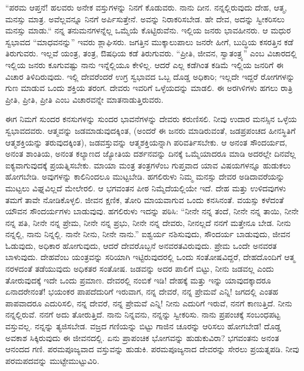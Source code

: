 “ಪರಮ ಆಪ್ತನೆ! ಹಲವರು ಅನೇಕ ವಸ್ತುಗಳನ್ನು ನಿನಗೆ ಕೊಡುವರು. ನಾನು ದೀನ. ನನ್ನಲ್ಲಿರುವುದು ದೇಹ, ಆತ್ಮ, ಮನಸ್ಸು ಮಾತ್ರ. ಅವೆಲ್ಲವನ್ನೂ ನಿನಗೆ ಅರ್ಪಿಸುತ್ತೇನೆ. ಅವನ್ನು ನಿರಾಕರಿಸಬೇಡ. ಹೇ ದೇವ, ಅದನ್ನು ಸ್ವೀಕರಿಸಲು ಮನಸ್ಸು ಮಾಡು.“ ನನ್ನ ತನುಮನಗಳನ್ನೆಲ್ಲ ಒಮ್ಮೆಯೆ ಕೊಟ್ಟಿರುವೆನು. ಇಲ್ಲಿಯ ಜನರು ಭಾವಹೀನರು. ಆ ಮಧುರ ಸ್ವಭಾವದ “ಮಾಧವನನ್ನು” ಇವರು ಶ್ಲಾಘಿಸರು. ಜಗತ್ತಿನ ಮುಕ್ಕಾಲುಪಾಲು ಜನರೇ ಹೀಗೆ, ಬುದ್ಧಿಯ ಕಸರತ್ತಿನ ಕಡೆ ತಿರುಗುವರು. ಇಲ್ಲವೆ ಯಂತ್ರ, ತಂತ್ರ, ಔಷಧಿಯ ಕಡೆ ತಿರುಗುವರು. “ಪ್ರೀತಿ, ಜೀವನ, ಸ್ವಾತಂತ್ರ್ಯ” ಎಂಬ ವಿಚಾರದಲ್ಲಿ ಇಲ್ಲಿಯ ಜನರು ಕೂಗುವಷ್ಟು ನಾನು ಇನ್ನೆಲ್ಲಿಯೂ ಕೇಳಿಲ್ಲ. ಆದರೆ ಎಲ್ಲ ಕಡೆಗಿಂತ ಕಡಿಮೆ ಇಲ್ಲಿಯ ಜನರಿಗೆ ಈ ವಿಚಾರ ತಿಳಿದಿರುವುದು. ಇಲ್ಲಿ ದೇವರೆಂದರೆ ಉಗ್ರ ಸ್ವಭಾವದ ಒಬ್ಬ ದೊಡ್ಡ ಅಧಿಕಾರಿ; ಇಲ್ಲದೇ ಇದ್ದರೆ ರೋಗಗಳನ್ನು ಗುಣ ಮಾಡುವ ಒಂದು ಶಕ್ತಿಯ ತರಂಗ. ದೇವರು ಇವರಿಗೆ ಒಳ್ಳೆಯದನ್ನು ಮಾಡಲಿ. ಈ ಅರಗಿಳಿಗಳು ಹಗಲು ರಾತ್ರಿ ಪ್ರೀತಿ, ಪ್ರೀತಿ, ಪ್ರೀತಿ ಎಂಬ ವಿಚಾರವನ್ನೇ ಮಾತನಾಡುತ್ತಿರುವರು.

ಈಗ ನಿಮಗೆ ಸುಂದರ ಕನಸುಗಳನ್ನು ಸುಂದರ ಭಾವನೆಗಳನ್ನು ದೇವರು ಕರುಣಿಸಲಿ. ನೀವು ಉದಾರ ಮನಸ್ಸಿನ ಒಳ್ಳೆಯ ಸ್ವಭಾವದವರು. ಆತ್ಮವನ್ನು ಜಡಮಾಡುವುದಕ್ಕಿಂತ, (ಅಂದರೆ ಈ ಜನರು ಮಾಡಿರುವಂತೆ, ಜಡಪ್ರಪಂಚದ ಹೀನಸ್ಥಿತಿಗೆ ಆತ್ಮಶಕ್ತಿಯನ್ನು ತರುವುದಕ್ಕಿಂತ), ಜಡವಸ್ತುವನ್ನು ಆತ್ಮಶಕ್ತಿಯನ್ನಾಗಿ ಪರಿವರ್ತಿಸಬೇಕು. ಆ ಅನಂತ ಸೌಂದರ್ಯದ, ಅನಂತ ಶಾಂತಿಯ, ಅನಂತ ಕಲ್ಯಾಣದ ಜ್ಯೋತಿಯ ದರ್ಶನವನ್ನು ದಿನಕ್ಕೆ ಒಮ್ಮೆಯಾದರೂ ಮಾಡಿ ಅದರಲ್ಲೇ ದಿನವೆಲ್ಲ ಐಕ್ಯವಾಗುವುದಕ್ಕೆ ಪ್ರಯತ್ನಿಸಬೇಕು. ಮಾಯಾ ಮಂತ್ರ ತಂತ್ರಗಳೆಂಬ ಗುಪ್ತವಾದ ಯಾವ ವಿಷಯಗಳನ್ನೂ ಹುಡುಕಲು ಹೋಗಬೇಡಿ. ಅವುಗಳನ್ನು ಕಾಲಿನಿಂದಲೂ ಮುಟ್ಟಬೇಡಿ. ಹಗಲಿರುಳು ನಿಮ್ಮ ಮನಸ್ಸು ದೇವರ ಅಡಿದಾವರೆಯನ್ನು ಮುಟ್ಟಲು ವಿಘ್ನವಿಲ್ಲದೆ ಮೇಲೇರಲಿ. ಆ ಭಗವಂತನ ಪೀಠ ನಿಮ್ಮೆದೆಯಲ್ಲಿಯೇ ಇದೆ. ದೇಹ ಮತ್ತು ಉಳಿದವುಗಳು ತಮಗೆ ತಾವೇ ನೋಡಿಕೊಳ್ಳಲಿ. ಜೀವನ ಕ್ಷಣಿಕ, ತೋರಿ ಮಾಯವಾಗುವ ಒಂದು ಕನಸಿನಂತೆ. ವಯಸ್ಸು ಕಳೆದಂತೆ ಯೌವನ ಸೌಂದರ್ಯಗಳು ಬಾಡುವುವು. ಹಗಲಿರುಳು ಇದನ್ನು ಪಠಿಸಿ: “ನೀನೇ ನನ್ನ ತಂದೆ, ನೀನೇ ನನ್ನ ತಾಯಿ, ನೀನೇ ನನ್ನ ಪತಿ, ನೀನೇ ನನ್ನ ಪ್ರೇಮ, ನೀನೇ ನನ್ನ ಪ್ರಭು, ನೀನೇ ನನ್ನ ದೇವರು, ನೀನಲ್ಲದೆ ನನಗೆ ಮತ್ತೇನೂ ಬೇಡ. ನೀನು ನನ್ನಲ್ಲಿ, ನಾನು ನಿನ್ನಲ್ಲಿ. ನಾನೇ ನೀನು, ನೀನೇ ನಾನು.” ಐಶ್ವರ್ಯ ನಶಿಸುವುದು, ಸೌಂದರ್ಯ ಬಾಡುವುದು, ಜೀವನ ಓಡುವುದು, ಅಧಿಕಾರ ಹೋಗುವುದು, ಆದರೆ ದೇವರೊಬ್ಬನೆ ಅನವರತವಿರುವುದು. ಪ್ರೇಮ ಒಂದೇ ಅನವರತ ಬಾಳುವುದು. ದೇಹವೆಂಬ ಯಂತ್ರವನ್ನು ಸರಿಯಾಗಿ ಇಟ್ಟಿರುವುದರಲ್ಲಿ ಒಂದು ಸಂತೋಷವಿದ್ದರೆ, ದೇಹದೊಂದಿಗೆ ಆತ್ಮ ನರಳದಂತೆ ತಡೆಯುವುದು ಅಧಿಕತರ ಸಂತೋಷ. ಜಡವನ್ನು ಅದರ ಪಾಲಿಗೆ ಬಿಟ್ಟು, ನೀನು ಜಡವಲ್ಲ ಎಂದು ತೋರುವುದಕ್ಕೆ ಇದೇ ಒಂದು ಪ್ರಮಾಣ. ದೇವರಲ್ಲಿ ನಂಬಿಕೆ ಇಡಿ! ದೇಹಕ್ಕೆ ಮತ್ತು ಇನ್ನು ಯಾವುದಕ್ಕಾದರೂ ಏನಾದರೇನಂತೆ! ಭಯಂಕರ ಪಾಪದೆದುರಿಗೆ ಇರುವಾಗ, ನನ್ನ ದೇವರೆ, ನನ್ನ ಪ್ರೇಮವೆ ಎನ್ನಿ! ಜಗದಲ್ಲಿ ಎಂತಹ ಪಾಪವಾದರೂ ಎದುರಿಸಲಿ, ನನ್ನ ದೇವರೆ, ನನ್ನ ಪ್ರೇಮವೆ ಎನ್ನಿ! ನೀನು ಎದುರಿಗೆ ಇರುವೆ, ನನಗೆ ಕಾಣುತ್ತಿದೆ. ನೀನು ನನ್ನಲ್ಲಿರುವೆ. ನನಗೆ ಅದು ತೋರುತ್ತಿದೆ. ನಾನು ನಿನ್ನವನು, ನನ್ನನ್ನು ಸ್ವೀಕರಿಸು. ನಾನು ಪ್ರಪಂಚಕ್ಕೆ ಸಂಬಂಧಪಟ್ಟ ವಸ್ತುವಲ್ಲ. ನನ್ನನ್ನು ತ್ಯಜಿಸಬೇಡ. ವಜ್ರದ ಗಣಿಯನ್ನು ಬಿಟ್ಟು ಗಾಜಿನ ಚೂರನ್ನು ಆರಿಸಲು ಹೋಗಬೇಡ! ದೊಡ್ಡ ಅವಕಾಶ ಸಿಕ್ಕಿರುವುದು ಈ ಜೀವನದಲ್ಲಿ. ಏನು ಪ್ರಾಪಂಚಿಕ ಭೋಗವನ್ನು ಹುಡುಕುವಿರಾ? ಭಗವಂತನು ಅನಂತ ಆನಂದದ ಗಣಿ. ಪರಮಪೂಜ್ಯವಾದ ವಸ್ತುವನ್ನು ಹುಡುಕಿ. ಪರಮಪೂಜ್ಯನಾದ ದೇವರನ್ನು ಸೇರಲು ಪ್ರಯತ್ನಪಡಿ. ನೀವು ಪರಮಪದವನ್ನು ಮುಟ್ಟೇಮುಟ್ಟುವಿರಿ.

